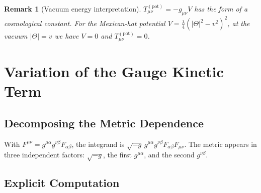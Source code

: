 \documentclass[12pt]{article}
\newtheorem{remark}[definition]{Remark}
\begin{document}
\begin{remark}[Vacuum energy interpretation]
  $T^{(\mathrm{pot})}_{\mu\nu} = -g_{\mu\nu}V$ has the form of a
  cosmological constant.  For the Mexican-hat potential
  $V = \tfrac{\lambda}{4}(|\Theta|^2-v^2)^2$, at the vacuum
  $|\Theta|=v$ we have $V=0$ and $T^{(\mathrm{pot})}_{\mu\nu}=0$.
\end{remark}

\section{Variation of the Gauge Kinetic Term}
\label{sec:gauge}

\subsection{Decomposing the Metric Dependence}

With $F^{\mu\nu} = g^{\mu\alpha}g^{\nu\beta}F_{\alpha\beta}$, the
integrand is $\sqrt{-g}\,g^{\mu\alpha}g^{\nu\beta}F_{\alpha\beta}F_{\mu\nu}$.
The metric appears in three independent factors: $\sqrt{-g}$, the first
$g^{\mu\alpha}$, and the second $g^{\nu\beta}$.

\subsection{Explicit Computation}
\end{document}
